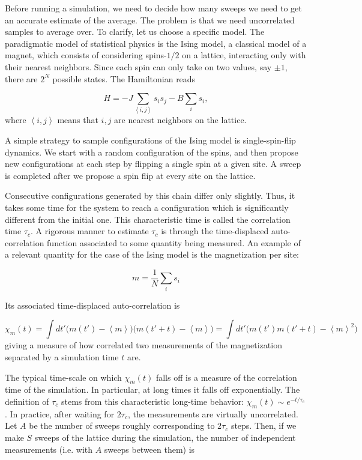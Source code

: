 Before running a simulation, we need to decide how many sweeps we need to get an accurate estimate of the average.
The problem is that we need uncorrelated samples to average over.
To clarify, let us choose a specific model.
The paradigmatic model of statistical physics is the Ising model, a classical model of a magnet, which consists of considering spins-$1/2$ on a lattice, interacting only with their nearest neighbors.
Since each spin can only take on two values, say $\pm 1$, there are $2^N$ possible states.
The Hamiltonian reads

\begin{equation}
H = - J \sum_{\left\langle i, j \right\rangle } s_i s_j - B \sum_i s_i ,
\end{equation}
where $\left\langle i, j \right\rangle$ means that $i, j $ are nearest neighbors on the lattice.

A simple strategy to sample configurations of the Ising model is single-spin-flip dynamics.
We start with a random configuration of the spins, and then propose new configurations at each step by flipping a single spin at a given site.
A sweep is completed after we propose a spin flip at every site on the lattice.

Consecutive configurations generated by this chain differ only slightly.
Thus, it takes some time for the system to reach a configuration which is significantly different from the initial one.
This characteristic time is called the correlation time $\tau_c$.
A rigorous manner to estimate $\tau_c$ is through the time-displaced auto-correlation function associated to some quantity being measured.
An example of a relevant quantity for the case of the Ising model is the magnetization per site:

\begin{equation}
m = \frac{1}{N} \sum_i s_i
\end{equation}

Its associated time-displaced auto-correlation is

\begin{equation}
\chi_m ( t ) = \int dt' \bigg( m ( t' ) - \left\langle m \right\rangle \bigg) \bigg( m ( t' + t ) - \left\langle m \right\rangle \bigg) = \int dt' \bigg( m ( t' ) m ( t' + t ) - \left\langle m \right\rangle^2 \bigg)
\end{equation}
giving a measure of how correlated two measurements of the magnetization separated by a simulation time $t$ are.

The typical time-scale on which $\chi_m (t)$ falls off is a measure of the correlation time of the simulation.
In particular, at long times it falls off exponentially.
The definition of $\tau_c$ stems from this characteristic long-time behavior: $\chi_m (t) \sim e^{-t / \tau_c}$.
In practice, after waiting for $2\tau_c$, the measurements are virtually uncorrelated.
Let $A$ be the number of sweeps roughly  corresponding to $2\tau_c$ steps.
Then, if we make $S$ sweeps of the lattice during the simulation, the number of independent measurements (i.e. with $A$ sweeps between them) is

